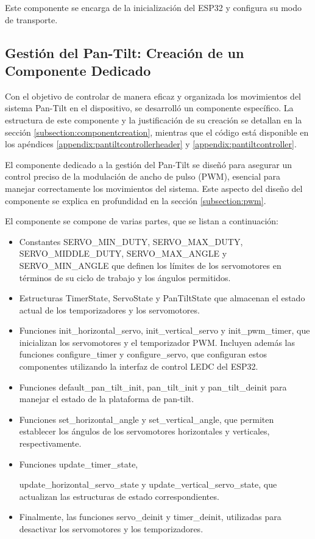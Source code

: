 Este componente se encarga de la inicialización del ESP32 y configura su modo de transporte.


\subsection{Gestión del Pan-Tilt: Creación de un Componente Dedicado}

Con el objetivo de controlar de manera eficaz y organizada los movimientos del sistema Pan-Tilt en el dispositivo, se desarrolló un componente específico. La estructura de este componente y la justificación de su creación se detallan en la sección \ref{subsection:componentcreation}, mientras que el código está disponible en los apéndices \ref{appendix:pantiltcontrollerheader} y \ref{appendix:pantiltcontroller}.



El componente dedicado a la gestión del Pan-Tilt se diseñó para asegurar un control preciso de la modulación de ancho de pulso (PWM), esencial para manejar correctamente los movimientos del sistema. Este aspecto del diseño del componente se explica en profundidad en la sección \ref{subsection:pwm}.



El componente se compone de varias partes, que se listan a continuación:

\begin{itemize}
    \item Constantes SERVO\_MIN\_DUTY, SERVO\_MAX\_DUTY, SERVO\_MIDDLE\_DUTY, SERVO\_MAX\_ANGLE y SERVO\_MIN\_ANGLE que definen los límites de los servomotores en términos de su ciclo de trabajo y los ángulos permitidos.
    \item Estructuras TimerState, ServoState y PanTiltState que almacenan el estado actual de los temporizadores y los servomotores.
    \item Funciones init\_horizontal\_servo, init\_vertical\_servo y init\_pwm\_timer, que inicializan los servomotores y el temporizador PWM. Incluyen además las funciones configure\_timer y configure\_servo, que configuran estos componentes utilizando la interfaz de control LEDC del ESP32.
    \item Funciones default\_pan\_tilt\_init, pan\_tilt\_init y pan\_tilt\_deinit para manejar el estado de la plataforma de pan-tilt.
    \item Funciones set\_horizontal\_angle y set\_vertical\_angle, que permiten establecer los ángulos de los servomotores horizontales y verticales, respectivamente.
    \item Funciones update\_timer\_state, 
    
    update\_horizontal\_servo\_state y update\_vertical\_servo\_state, que actualizan las estructuras de estado correspondientes.
    \item Finalmente, las funciones servo\_deinit y timer\_deinit, utilizadas para desactivar los servomotores y los temporizadores.
\end{itemize}

